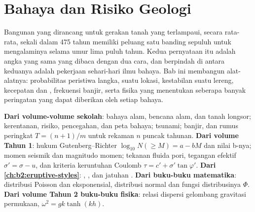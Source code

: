 \chapter{Bahaya dan Risiko Geologi}\label{ch:b2:geological-hazards}

Bangunan yang dirancang untuk gerakan tanah yang terlampaui, secara rata-rata, sekali dalam 475 tahun memiliki
peluang satu banding sepuluh untuk mengalaminya selama umur lima puluh tahun. Kedua pernyataan itu adalah angka yang sama
yang dibaca dengan dua cara, dan berpindah di antara keduanya adalah pekerjaan sehari-hari ilmu bahaya. Bab ini
membangun alat-alatnya: probabilitas peristiwa langka,  suatu lokasi, kestabilan suatu
lereng, kecepatan dan , frekuensi banjir, serta fisika yang menentukan
seberapa banyak peringatan yang dapat diberikan oleh setiap bahaya.

\begin{recall}
\textbf{Dari volume-volume sekolah}: bahaya alam, bencana alam, dan tanah longsor; kerentanan,
risiko, pencegahan, dan peta bahaya; tsunami;  banjir, dan rumus peringkat
$T = (n + 1)/m$ untuk rekaman $n$ puncak tahunan. \textbf{Dari volume Tahun 1}: hukum
Gutenberg--Richter $\log_{10} N(\geq M) = a - bM$ dan nilai b-nya; momen seismik dan magnitudo
momen; tekanan fluida pori, tegangan efektif $\sigma' = \sigma - u$, dan kriteria keruntuhan
Coulomb $\tau = c' + \sigma' \tan\varphi'$. \textbf{Dari \cref{ch:b2:eruptive-styles}}: , , dan jatuhan . \textbf{Dari buku-buku matematika}: distribusi Poisson dan
eksponensial, distribusi normal dan fungsi distribusinya $\Phi$.
\textbf{Dari volume Tahun 2 buku-buku fisika}: relasi dispersi gelombang gravitasi permukaan,
$\omega^2 = gk\tanh(kh)$.
\end{recall}

